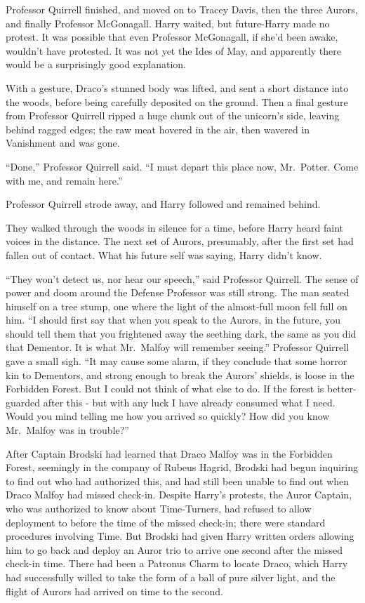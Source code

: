 Professor Quirrell finished, and moved on to Tracey Davis, then the
three Aurors, and finally Professor McGonagall. Harry waited, but
future-Harry made no protest. It was possible that even Professor
McGonagall, if she'd been awake, wouldn't have protested. It was not yet
the Ides of May, and apparently there would be a surprisingly good
explanation.

With a gesture, Draco's stunned body was lifted, and sent a short
distance into the woods, before being carefully deposited on the ground.
Then a final gesture from Professor Quirrell ripped a huge chunk out of
the unicorn's side, leaving behind ragged edges; the raw meat hovered in
the air, then wavered in Vanishment and was gone.

``Done,'' Professor Quirrell said. ``I must depart this place now,
Mr.~Potter. Come with me, and remain here.''

Professor Quirrell strode away, and Harry followed and remained behind.

They walked through the woods in silence for a time, before Harry heard
faint voices in the distance. The next set of Aurors, presumably, after
the first set had fallen out of contact. What his future self was
saying, Harry didn't know.

``They won't detect us, nor hear our speech,'' said Professor Quirrell.
The sense of power and doom around the Defense Professor was still
strong. The man seated himself on a tree stump, one where the light of
the almost-full moon fell full on him. ``I should first say that when
you speak to the Aurors, in the future, you should tell them that you
frightened away the seething dark, the same as you did that Dementor. It
is what Mr.~Malfoy will remember seeing.'' Professor Quirrell gave a
small sigh. ``It may cause some alarm, if they conclude that some horror
kin to Dementors, and strong enough to break the Aurors' shields, is
loose in the Forbidden Forest. But I could not think of what else to do.
If the forest is better-guarded after this - but with any luck I have
already consumed what I need. Would you mind telling me how you arrived
so quickly? How did you know Mr.~Malfoy was in trouble?''

After Captain Brodski had learned that Draco Malfoy was in the Forbidden
Forest, seemingly in the company of Rubeus Hagrid, Brodski had begun
inquiring to find out who had authorized this, and had still been unable
to find out when Draco Malfoy had missed check-in. Despite Harry's
protests, the Auror Captain, who was authorized to know about
Time-Turners, had refused to allow deployment to before the time of the
missed check-in; there were standard procedures involving Time. But
Brodski had given Harry written orders allowing him to go back and
deploy an Auror trio to arrive one second after the missed check-in
time. There had been a Patronus Charm to locate Draco, which Harry had
successfully willed to take the form of a ball of pure silver light, and
the flight of Aurors had arrived on time to the second.

